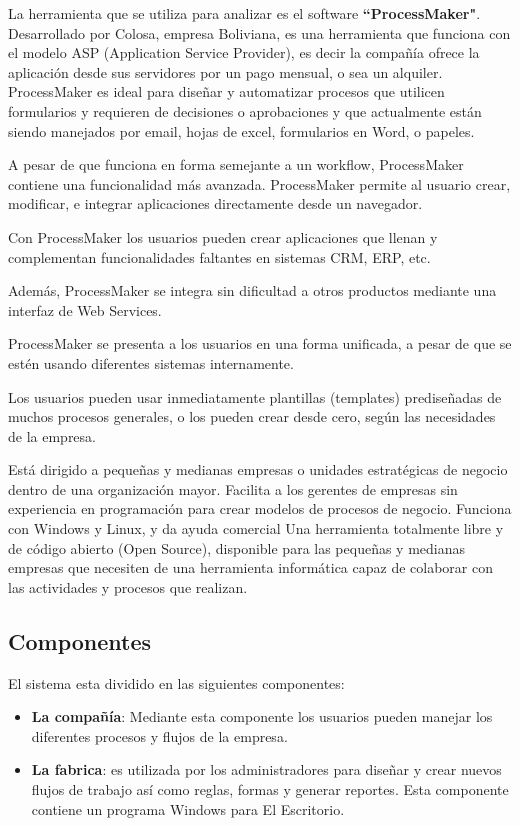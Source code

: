 La herramienta que se utiliza para analizar es el software \textbf{``ProcessMaker"}.
\\
Desarrollado por Colosa, empresa Boliviana, es una herramienta que funciona con el modelo ASP (Application Service Provider), es decir la compañía ofrece la aplicación desde sus servidores por un pago mensual, o sea un alquiler.
ProcessMaker es ideal para diseñar y automatizar procesos que utilicen formularios y requieren de decisiones o aprobaciones y que actualmente están siendo manejados por email, hojas de excel, formularios en Word, o papeles.

A pesar de que funciona en forma semejante a un workflow, ProcessMaker contiene una funcionalidad más avanzada. ProcessMaker permite al usuario crear, modificar, e integrar aplicaciones directamente desde un navegador.

Con ProcessMaker los usuarios pueden crear aplicaciones que llenan y complementan funcionalidades faltantes en sistemas CRM, ERP, etc.

Además, ProcessMaker se integra sin dificultad a otros productos mediante una interfaz de Web Services.

ProcessMaker se presenta a los usuarios en una forma unificada, a pesar de que se estén usando diferentes sistemas internamente.

Los usuarios pueden usar inmediatamente plantillas (templates) prediseñadas de muchos procesos generales, o los pueden crear desde cero, según las necesidades de la empresa.

Está dirigido a pequeñas y medianas empresas o unidades estratégicas de negocio dentro de una organización mayor. Facilita a los gerentes de empresas sin experiencia en programación para crear modelos de procesos de negocio. Funciona con Windows y Linux, y da ayuda comercial
Una herramienta totalmente libre y de código abierto (Open Source), disponible para las pequeñas y medianas empresas que necesiten de una herramienta informática capaz de colaborar con las actividades y procesos que realizan.

\subsection{ Componentes}
El sistema esta dividido en las siguientes componentes:
\begin{itemize}
\item  \textbf{La compañía}: Mediante esta componente los usuarios pueden manejar los diferentes procesos y flujos de la empresa.
\item \textbf{La fabrica}: es utilizada por los administradores para diseñar y crear nuevos flujos de trabajo así como reglas, formas y generar reportes. Esta componente contiene un programa Windows para El Escritorio.
\end{itemize}

